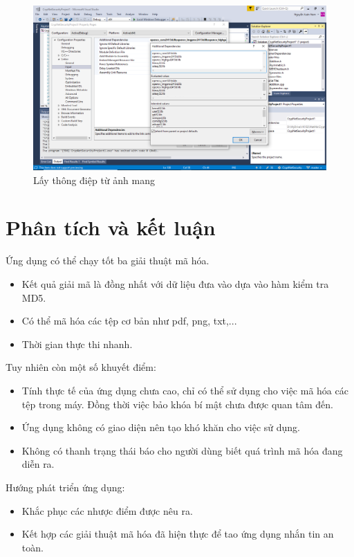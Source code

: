 \documentclass[a4paper]{article}
\begin{document}
    \begin{figure}[htp]
        \centering
        \includegraphics[scale=0.4]{msvcinput.png}
        \caption{Lấy thông điệp từ ảnh mang}
        \label{fig:msvcinput}
    \end{figure}
\section{Phân tích và kết luận}
Ứng dụng có thể chạy tốt ba giải thuật mã hóa.
\begin{itemize}
    \item Kết quả giải mã là đồng nhất với dữ liệu đưa vào dựa vào hàm kiểm tra MD5.
    \item Có thể mã hóa các tệp cơ bản như pdf, png, txt,...
    \item Thời gian thực thi nhanh.
\end{itemize}
Tuy nhiên còn một số khuyết điểm:
\begin{itemize}
    \item Tính thực tế của ứng dụng chưa cao, chỉ có thể sử dụng cho việc mã hóa các tệp trong máy. Đồng thời việc bảo khóa bí mật chưa được quan tâm đến.
    \item Ứng dụng không có giao diện nên tạo khó khăn cho việc sử dụng.
    \item Không có thanh trạng thái báo cho người dùng biết quá trình mã hóa đang diễn ra.
\end{itemize}
Hướng phát triển ứng dụng:
\begin{itemize}
    \item Khắc phục các nhược điểm được nêu ra.
    \item Kết hợp các giải thuật mã hóa đã hiện thực để tao ứng dụng nhắn tin an toàn.
\end{itemize}
\end{document}
